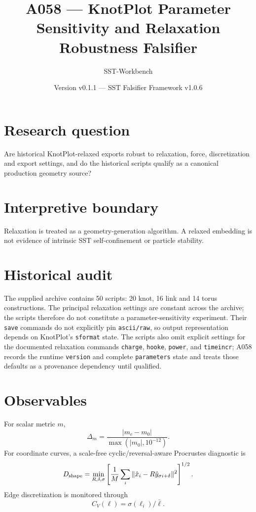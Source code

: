 \documentclass[11pt,a4paper]{article}
\title{A058 --- KnotPlot Parameter Sensitivity and Relaxation Robustness Falsifier}
\author{SST-Workbench}\date{Version v0.1.1 --- SST Falsifier Framework v1.0.6}
\newcommand{\code}[1]{\texttt{#1}}
\begin{document}
\maketitle\sloppy
\section{Research question}
Are historical KnotPlot-relaxed exports robust to relaxation, force, discretization and export settings, and do the historical scripts qualify as a canonical production geometry source?
\section{Interpretive boundary}
Relaxation is treated as a geometry-generation algorithm. A relaxed embedding is not evidence of intrinsic SST self-confinement or particle stability.
\section{Historical audit}
The supplied archive contains 50 scripts: 20 knot, 16 link and 14 torus constructions. The principal relaxation settings are constant across the archive; the scripts therefore do not constitute a parameter-sensitivity experiment. Their \code{save} commands do not explicitly pin \code{ascii/raw}, so output representation depends on KnotPlot's \code{sformat} state. The scripts also omit explicit settings for the documented relaxation commands \code{charge}, \code{hooke}, \code{power}, and \code{timeincr}; A058 records the runtime \code{version} and complete \code{parameters} state and treats those defaults as a provenance dependency until qualified.
\section{Observables}
For scalar metric $m$,
\begin{equation}\Delta_m=\frac{|m_c-m_0|}{\max(|m_0|,10^{-12})}.\end{equation}
For coordinate curves, a scale-free cyclic/reversal-aware Procrustes diagnostic is
\begin{equation}
D_{\rm shape}=\min_{R,\delta,\sigma}\left[\frac1M\sum_i\|\hat x_i-R\hat y_{\sigma i+\delta}\|^2\right]^{1/2}.
\end{equation}
Edge discretization is monitored through
\begin{equation}C_V(\ell)=\sigma(\ell_i)/\bar\ell.\end{equation}
\end{document}
